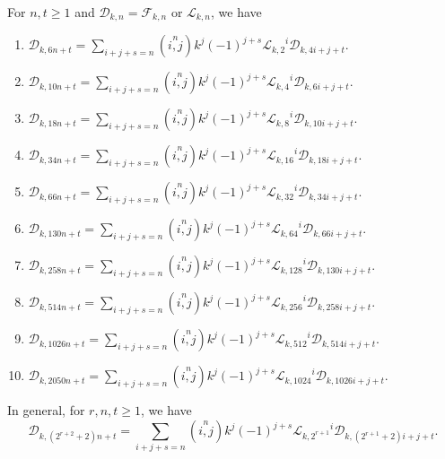 \begin{theorem}For $n, t\geq 1$ and $\mathcal{D}_{k,n}=\mathcal{F}_{k,n}$ or $\mathcal{L}_{k,n}$, we have\label{3.7}
\begin{enumerate}
\item $\mathcal{D}_{k,6n+t}=\sum\limits_{i+j+s=n}\left( \stackrel{n}{i,j}\right) k^{j}(-1)^{j+s}{\mathcal{L}_{k,2}}^i\mathcal{D}_{k,4i+j+t} $.
\item $\mathcal{D}_{k,10n+t}=\sum\limits_{i+j+s=n}\left( \stackrel{n}{i,j}\right) k^{j}(-1)^{j+s}{\mathcal{L}_{k,4}}^i\mathcal{D}_{k,6i+j+t} $.
\item $\mathcal{D}_{k,18n+t}=\sum\limits_{i+j+s=n}\left( \stackrel{n}{i,j}\right) k^{j}(-1)^{j+s}{\mathcal{L}_{k,8}}^i\mathcal{D}_{k,10i+j+t} $.
\item $\mathcal{D}_{k,34n+t}=\sum\limits_{i+j+s=n}\left( \stackrel{n}{i,j}\right) k^{j}(-1)^{j+s}{\mathcal{L}_{k,16}}^i\mathcal{D}_{k,18i+j+t} $.
\item $\mathcal{D}_{k,66n+t}=\sum\limits_{i+j+s=n}\left( \stackrel{n}{i,j}\right) k^{j}(-1)^{j+s}{\mathcal{L}_{k,32}}^i\mathcal{D}_{k,34i+j+t} $.
\item $\mathcal{D}_{k,130n+t}=\sum\limits_{i+j+s=n}\left( \stackrel{n}{i,j}\right) k^{j}(-1)^{j+s}{\mathcal{L}_{k,64}}^i\mathcal{D}_{k,66i+j+t} $.
\item $\mathcal{D}_{k,258n+t}=\sum\limits_{i+j+s=n}\left( \stackrel{n}{i,j}\right) k^{j}(-1)^{j+s}{\mathcal{L}_{k,128}}^i\mathcal{D}_{k,130i+j+t} $.
\item $\mathcal{D}_{k,514n+t}=\sum\limits_{i+j+s=n}\left( \stackrel{n}{i,j}\right) k^{j}(-1)^{j+s}{\mathcal{L}_{k,256}}^i\mathcal{D}_{k,258i+j+t} $.
\item $\mathcal{D}_{k,1026n+t}=\sum\limits_{i+j+s=n}\left( \stackrel{n}{i,j}\right) k^{j}(-1)^{j+s}{\mathcal{L}_{k,512}}^i\mathcal{D}_{k,514i+j+t} $.
\item $\mathcal{D}_{k,2050n+t}=\sum\limits_{i+j+s=n}\left( \stackrel{n}{i,j}\right) k^{j}(-1)^{j+s}{\mathcal{L}_{k,1024}}^i\mathcal{D}_{k,1026i+j+t} $.
\end{enumerate}
In general, for $r, n, t\geq 1$, we have
$$\mathcal{D}_{k,(2^{r+2}+2)n+t}=\sum\limits_{i+j+s=n}\left( \stackrel{n}{i,j}\right) k^{j}(-1)^{j+s}{\mathcal{L}_{k,2^{r+1}}}^i\mathcal{D}_{k,(2^{r+1}+2)i+j+t}.$$
\end{theorem}
